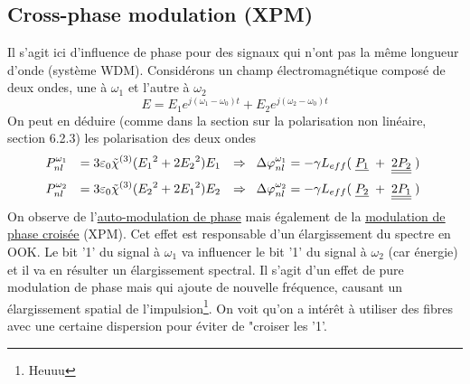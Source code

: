 \subsection{Cross-phase modulation (XPM)}
Il s'agit ici d'influence de phase pour des signaux qui n'ont pas la même longueur d'onde (système
WDM). Considérons un champ électromagnétique composé de deux ondes, une à $\omega_1$ et l'autre
à $\omega_2$
\begin{equation}
E = {E_1}{e^{j({\omega _1} - {\omega _0})t}} + {E_2}{e^{j({\omega _2} - {\omega _0})t}}
\end{equation}
On peut en déduire (comme dans la section sur la polarisation non linéaire, section 6.2.3) les 
polarisation des deux ondes
\begin{equation}
\begin{array}{lll}
P_{nl}^{{\omega _1}} &\DS= 3{\varepsilon _0}{\tilde \chi ^{(3)}}({E_1}{^2} + 2{E_2}{^2}){E_1}
&\DS\Rightarrow \;\;\Delta \varphi _{nl}^{{\omega _1}} =  - \gamma {L_{eff}}(\;\underline{P_1}\; + \;\underline{\underline{2P_2}}\;)\;
\vspace{2mm}\\
P_{nl}^{{\omega _2}}&\DS= 3{\varepsilon _0}{\tilde \chi ^{(3)}}({E_2}{^2} + 2{E_1}{^2}){E_2}&\DS
\Rightarrow \;\;\Delta \varphi _{nl}^{{\omega _2}} =  - \gamma {L_{eff}}(\;\underline{P_2}\; + \;\underline{\underline{{2P_1}}}\;)
\end{array}
\end{equation}
On observe de l'\underline{auto-modulation de phase} mais également 
de la \underline{\underline{modulation de phase croisée}} (XPM). Cet effet est responsable 
d'un élargissement du spectre en OOK. Le bit '1' du signal à $\omega_1$ va influencer
le bit '1' du signal à $\omega_2$ (car énergie) et il va en résulter un élargissement spectral. Il
s'agit d'un effet de pure modulation de phase mais qui ajoute de nouvelle fréquence, causant un
élargissement spatial de l'impulsion\footnote{Heuuu}. On voit qu'on a intérêt à utiliser des
fibres avec une certaine dispersion pour éviter de "croiser les '1'.


